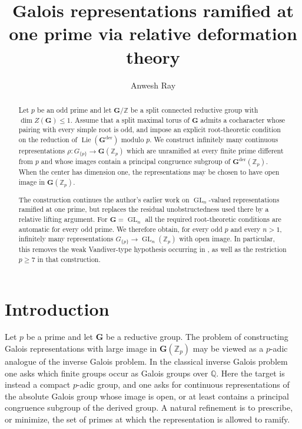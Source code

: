 \documentclass[11pt]{amsart}
\title[Galois representations ramified at one prime]{Galois representations ramified at one prime via relative deformation theory}
\author{Anwesh Ray}
\date{}
\numberwithin{equation}{section}
\newcommand{\Q}{\mathbb Q}
\newcommand{\Z}{\mathbb Z}
\newcommand{\Zp}{\mathbb Z_p}
\newcommand{\GG}{\mathbf G}
\newcommand{\Gder}{\mathbf G^{\mathrm{der}}}
\newcommand{\Lie}{\operatorname{Lie}}
\newcommand{\GL}{\operatorname{GL}}
\theoremstyle{definition}
\begin{document}
\begin{abstract}
Let $p$ be an odd prime and let $\GG/\Z$ be a split connected reductive
group with $\dim Z(\GG)\leq1$. Assume that a split maximal torus of
$\GG$ admits a cocharacter whose pairing with every simple root is
odd, and impose an explicit root-theoretic condition on the reduction
of $\Lie(\Gder)$ modulo $p$. We construct infinitely many continuous
representations $\rho:G_{\{p\}}\longrightarrow\GG(\Zp)$
which are unramified at every finite prime different from $p$ and whose
images contain a principal congruence subgroup of $\Gder(\Zp)$. When
the center has dimension one, the representations may be chosen to have
open image in $\GG(\Zp)$.

The construction continues the author's earlier work on
$\GL_n$-valued representations ramified at one prime, but replaces the
residual unobstructedness used there by a relative lifting argument. For $\GG=\GL_n$ all the required root-theoretic conditions are
automatic for every odd prime. We therefore obtain, for every odd
$p$ and every $n>1$, infinitely many representations
$G_{\{p\}}\to\GL_n(\Zp)$ with open image. In particular, this removes
the weak Vandiver-type hypothesis occurring in
\cite{Ray2023}, as well as the restriction $p\geq7$ in that
construction.
\end{abstract}

\maketitle

\section{Introduction}\label{sec:introduction}

\par Let $p$ be a prime and let $\GG$ be a reductive group. The problem of
constructing Galois representations with large image in
$\GG(\Zp)$ may be viewed as a $p$-adic analogue of the inverse Galois
problem. In the classical inverse Galois problem one asks which finite
groups occur as Galois groups over $\Q$. Here the target is instead a
compact $p$-adic group, and one asks for continuous representations of
the absolute Galois group whose image is open, or at least contains a
principal congruence subgroup of the derived group. A natural
refinement is to prescribe, or minimize, the set of primes at which the
representation is allowed to ramify.
\end{document}
